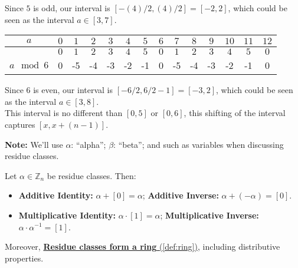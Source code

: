 \noindent
Since $5$ is odd, our interval is $[-(4)/2,(4)/2]=[-2,2]$, which could be seen as the interval $a\in[3,7]$.

\noindent

\begin{table}[h!]
    \setlength{\tabcolsep}{10pt} %
    \renewcommand{\arraystretch}{1.2} %
    \centering
\begin{tabular}{|*{14}{c|}}
    \hline
    \cellcolor{white}$a$ & $0$ & $1$ & $2$ &\cellcolor{OliveGreen!40} $3$ &\cellcolor{OliveGreen!40} $4$ &\cellcolor{OliveGreen!40} $5$ &\cellcolor{OliveGreen!40} $6$ &\cellcolor{OliveGreen!40} $7$ &\cellcolor{OliveGreen!40} $8$ & $9$ & $10$ & $11$ & $12$ \\
    \hline
       & $0$ & $1$ & $2$ & $3$ & $4$ & $5$ &\cellcolor{OliveGreen!20} $0$ &\cellcolor{OliveGreen!20} $1$ &\cellcolor{OliveGreen!20} $2$ & $3$ & $4$ & $5$ & $0$ \\
    \cline{2-14}
    \multirow{-2}{*}{$a\mod 6$}&0&-5&-4&\cellcolor{OliveGreen!20}-3&\cellcolor{OliveGreen!20}-2&\cellcolor{OliveGreen!20}-1&\cellcolor{OliveGreen!20}0&-5&-4&-3&-2&-1&0\\
    \hline
\end{tabular}
\end{table}

\noindent
Since $6$ is even, our interval is $[-6/2,6/2-1]=[-3,2]$, which could be seen as the interval $a\in[3,8]$.\\
This interval is no different than $[0,5]$ or $[0,6]$, this shifting of the interval captures $[x,x+(n-1)]$.

\begin{Note}
    \textbf{Note:} We'll use $\alpha$: ``alpha''; $\beta$: ``beta''; and such as variables when discussing residue classes.
\end{Note}
\begin{theo}
    
    \label{theo:res_class_ops}

    Let $\alpha\in\mathbb{Z}_n$ be residue classes. Then: 
    \begin{itemize}
        \item \textbf{Additive Identity:} $\alpha + [0] = \alpha$; \textbf{Additive Inverse:} $\alpha + (-\alpha) = [0]$.
        \item \textbf{Multiplicative Identity:} $\alpha\cdot [1] = \alpha$; \textbf{Multiplicative Inverse:} $\alpha\cdot \alpha^{-1} = [1]$.
    \end{itemize}
    \noindent
    Moreover, \underline{\textbf{Residue classes form a ring} (\ref{def:ring}),} including distributive properties.
\end{theo}

